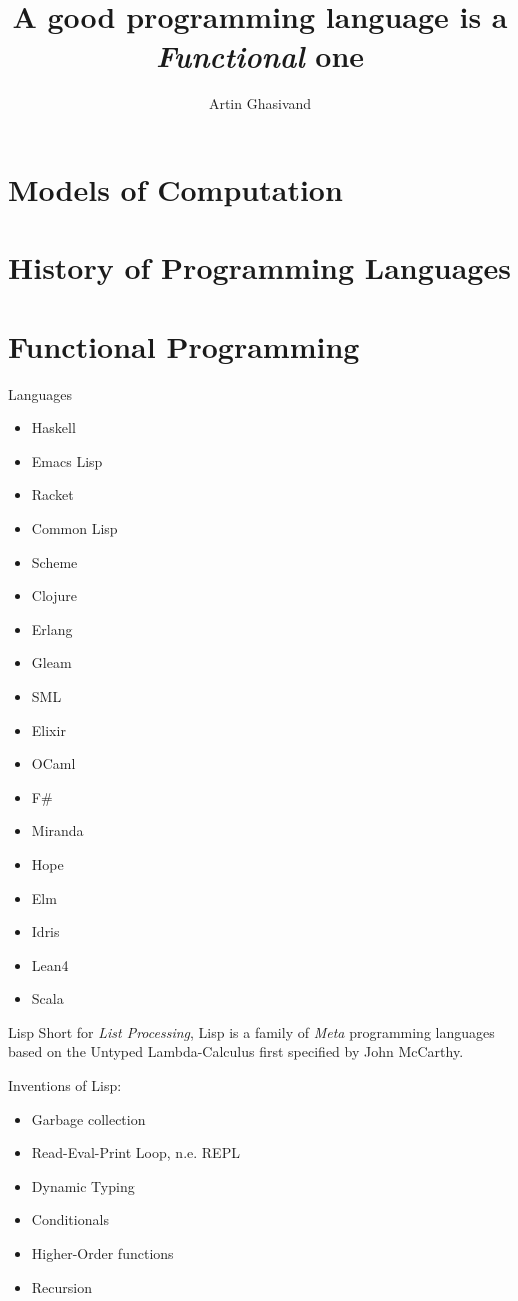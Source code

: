 \documentclass[pdf]{beamer}
\title{A good programming language is a \textit{Functional} one}
\author{Artin Ghasivand}
\begin{document}
\begin{frame}
  \titlepage
\end{frame}

\section{Models of Computation}
\label{sec:models-of-computation}

\section{History of Programming Languages}
\label{sec:history}

\section{Functional Programming}
\label{sec:fp}

\begin{frame}{Languages}
  \begin{itemize}
  \item Haskell
  \item Emacs Lisp
  \item Racket
  \item Common Lisp
  \item Scheme
  \item Clojure
  \item Erlang
  \item Gleam
  \item SML
  \item Elixir
  \item OCaml
  \item F\#
  \item Miranda
  \item Hope
  \item Elm
  \item Idris
  \item Lean4
  \item Scala
  \end{itemize}
\end{frame}

\begin{frame}{Lisp}
  Short for \textit{List Processing}, Lisp is a family of \textit{Meta} programming languages based on the Untyped Lambda-Calculus first specified by John McCarthy.

  Inventions of Lisp:
  \begin{itemize}
  \item Garbage collection
  \item Read-Eval-Print Loop, n.e. REPL
  \item Dynamic Typing
  \item Conditionals
  \item Higher-Order functions
  \item Recursion
  \end{itemize}
\end{frame}
\end{document}

